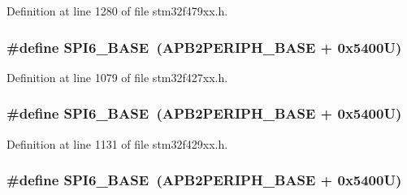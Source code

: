 Definition at line 1280 of file stm32f479xx.\+h.

\subsubsection[{\texorpdfstring{S\+P\+I6\+\_\+\+B\+A\+SE}{SPI6_BASE}}]{\setlength{\rightskip}{0pt plus 5cm}\#define S\+P\+I6\+\_\+\+B\+A\+SE~({\bf A\+P\+B2\+P\+E\+R\+I\+P\+H\+\_\+\+B\+A\+SE} + 0x5400\+U)}\hypertarget{group___peripheral__memory__map_gaf69c602bd348dc0aa1b4e829e40ebb70}{}\label{group___peripheral__memory__map_gaf69c602bd348dc0aa1b4e829e40ebb70}


Definition at line 1079 of file stm32f427xx.\+h.

\subsubsection[{\texorpdfstring{S\+P\+I6\+\_\+\+B\+A\+SE}{SPI6_BASE}}]{\setlength{\rightskip}{0pt plus 5cm}\#define S\+P\+I6\+\_\+\+B\+A\+SE~({\bf A\+P\+B2\+P\+E\+R\+I\+P\+H\+\_\+\+B\+A\+SE} + 0x5400\+U)}\hypertarget{group___peripheral__memory__map_gaf69c602bd348dc0aa1b4e829e40ebb70}{}\label{group___peripheral__memory__map_gaf69c602bd348dc0aa1b4e829e40ebb70}


Definition at line 1131 of file stm32f429xx.\+h.

\subsubsection[{\texorpdfstring{S\+P\+I6\+\_\+\+B\+A\+SE}{SPI6_BASE}}]{\setlength{\rightskip}{0pt plus 5cm}\#define S\+P\+I6\+\_\+\+B\+A\+SE~({\bf A\+P\+B2\+P\+E\+R\+I\+P\+H\+\_\+\+B\+A\+SE} + 0x5400\+U)}\hypertarget{group___peripheral__memory__map_gaf69c602bd348dc0aa1b4e829e40ebb70}{}\label{group___peripheral__memory__map_gaf69c602bd348dc0aa1b4e829e40ebb70}


